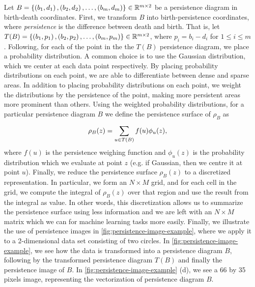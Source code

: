 Let $B = \left\{\left(b_1, d_1\right), \left(b_2, d_2\right), \ldots, \left(b_m, d_m\right)\right\} \in \mathbb{R}^{m \times 2}$ be a persistence diagram in birth-death coordinates. First, we transform $B$ into birth-persistence coordinates, where \textit{persistence} is the difference between death and birth. That is, let $T(B) = \left\{\left(b_1, p_1\right), \left(b_2, p_2\right), \ldots, \left(b_m, p_m\right)\right\} \in \mathbb{R}^{m \times 2}$, where $p_i = b_i - d_i$ for $1 \leq i \leq m$. Following, for each of the point in the the $T(B)$ persistence diagram, we place a probability distribution. A common choice is to use the Gaussian distribution, which we center at each data point respectively. By placing probability distributions on each point, we are able to differentiate between dense and sparse areas. In addition to placing probability distributions on each point, we weight the distributions by the persistence of the point, making more persistent areas more prominent than others. Using the weighted probability distributions, for a particular persistence diagram $B$ we define the persistence surface of $\rho_B$ as
\begin{align}
    \rho_B(z) = \sum\limits_{u \in T(B)}^{} f(u) \phi_u(z),
\end{align}
where $f(u)$ is the persistence weighing function and $\phi_u(z)$ is the probability distribution which we evaluate at point $z$ (e.g. if Gaussian, then we centre it at point $u$). Finally, we reduce the persistence surface $\rho_B(z)$ to a discretized representation. In particular, we form an $N \times M$ grid, and for each cell in the grid, we compute the integral of $\rho_B(z)$ over that region and use the result from the integral as value. In other words, this discretization allows us to summarize the persistence surface using less information and we are left with an $N \times M$ matrix which we can for machine learning tasks more easily. Finally, we illustrate the use of persistence images in \cref{fig:persistence-image-example}, where we apply it to a 2-dimensional data set consisting of two circles. In \cref{fig:persistence-image-example}, we see how the data is transformed into a persistence diagram $B$, following by the transformed persistence diagram $T(B)$ and finally the persistence image of $B$. In \cref{fig:persistence-image-example} (d), we see a 66 by 35 pixels image, representing the vectorization of persistence diagram $B$.
